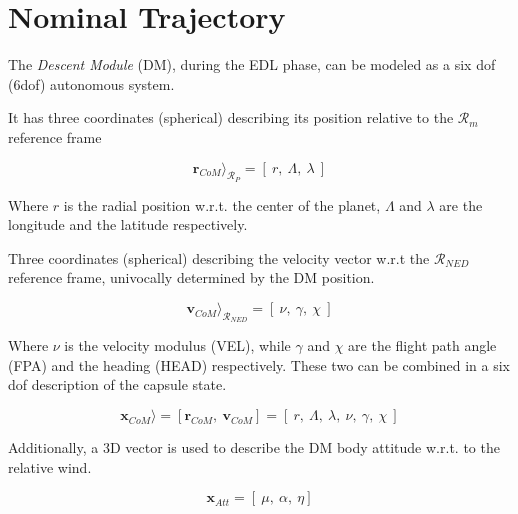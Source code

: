 \chapter{Nominal Trajectory}

The \textit{Descent Module} (DM), during the EDL phase, can be modeled as a
six dof (6dof) autonomous system.

It has three coordinates (spherical) describing its position relative to the
$\mathcal{R}_{m}$ reference frame

        $$
            \textbf{r}_{CoM}\rangle_{\mathcal{R}_{P}} = [\: r,\:\Lambda,\:\lambda \:]
        $$

\noindent Where $r$ is the radial position w.r.t. the center of the planet, $\Lambda$ and $\lambda$ are 
the longitude and the latitude respectively.

Three coordinates (spherical) describing the velocity vector w.r.t the $\mathcal{R}_{NED}$ reference frame, univocally
determined by the DM position.

        $$
            \textbf{v}_{CoM}\rangle_{\mathcal{R}_{NED}} = [\: \nu,\:\gamma,\:\chi \:]
        $$

\noindent Where $\nu$ is the velocity modulus (VEL), while $\gamma$ and $\chi$ are the flight
path angle (FPA) and the heading (HEAD) respectively.
These two can be combined in a six dof description of the capsule state.

        $$
            \textbf{x}_{CoM}\rangle = [\textbf{r}_{CoM},\: \textbf{v}_{CoM}] = [\: r,\:\Lambda,\:\lambda, \: \nu,\:\gamma,\:\chi \:]
        $$

Additionally, a 3D vector is used to describe the DM body attitude w.r.t. to the relative wind.

        $$
            \textbf{x}_{Att} = [\: \mu,\: \alpha,\: \eta]
        $$
